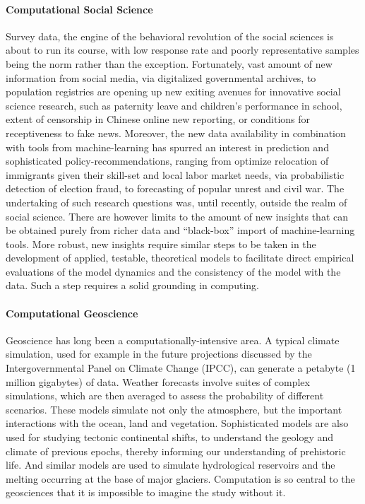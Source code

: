 \documentclass[]{article}
\let\oldparagraph\paragraph
\renewcommand{\paragraph}[1]{\oldparagraph{#1}\mbox{}}
\begin{document}
\hypertarget{computational-social-science}{%
\paragraph{Computational Social
Science}\label{computational-social-science}}

Survey data, the engine of the behavioral revolution of the social
sciences is about to run its course, with low response rate and poorly
representative samples being the norm rather than the exception.
Fortunately, vast amount of new information from social media, via
digitalized governmental archives, to population registries are opening
up new exiting avenues for innovative social science research, such as
paternity leave and children's performance in school, extent of
censorship in Chinese online new reporting, or conditions for
receptiveness to fake news. Moreover, the new data availability in
combination with tools from machine-learning has spurred an interest in
prediction and sophisticated policy-recommendations, ranging from
optimize relocation of immigrants given their skill-set and local labor
market needs, via probabilistic detection of election fraud, to
forecasting of popular unrest and civil war. The undertaking of such
research questions was, until recently, outside the realm of social
science. There are however limits to the amount of new insights that can
be obtained purely from richer data and ``black-box'' import of
machine-learning tools. More robust, new insights require similar steps
to be taken in the development of applied, testable, theoretical models
to facilitate direct empirical evaluations of the model dynamics and the
consistency of the model with the data. Such a step requires a solid
grounding in computing.

\hypertarget{computational-geoscience}{%
\paragraph{Computational Geoscience}\label{computational-geoscience}}

Geoscience has long been a computationally-intensive area. A typical
climate simulation, used for example in the future projections discussed
by the Intergovernmental Panel on Climate Change (IPCC), can generate a
petabyte (1 million gigabytes) of data. Weather forecasts involve suites
of complex simulations, which are then averaged to assess the
probability of different scenarios. These models simulate not only the
atmosphere, but the important interactions with the ocean, land and
vegetation. Sophisticated models are also used for studying tectonic
continental shifts, to understand the geology and climate of previous
epochs, thereby informing our understanding of prehistoric life. And
similar models are used to simulate hydrological reservoirs and the
melting occurring at the base of major glaciers. Computation is so
central to the geosciences that it is impossible to imagine the study
without it.
\end{document}

